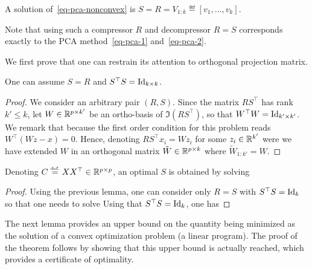 \begin{thm}\label{thm-pca-optim}
	A solution of~\eqref{eq-pca-nonconvex} is $S=R=V_{1:k} \eqdef [v_1,\ldots,v_k]$.
\end{thm}

Note that using such a compressor $R$ and decompressor $R=S$ corresponds exactly to the PCA method~\eqref{eq-pca-1} and~\eqref{eq-pca-2}.

We first prove that one can restrain its attention to orthogonal projection matrix.

\begin{lem}
	One can assume $S=R$ and $S^\top S = \mathrm{Id}_{k\times k}$.
\end{lem}
\begin{proof}
	We consider an arbitrary pair $(R,S)$. Since the matrix $R S^\top$ has rank $k' \leq k$, let $W \in \mathbb{R}^{p \times k'}$ be an ortho-basis of $\Im(RS^\top)$, so that $W^\top W = \mathrm{Id}_{k' \times k'}$. We remark that 
	because the first order condition for this problem reads $W^\top(Wz-x)=0$.
	Hence, denoting $RS^\top x_i = Wz_i$ for some $z_i \in \mathbb{R}^{k'}$
	were we have extended $W$ in an orthogonal matrix $\tilde W \in \mathbb{R}^{p \times k}$ where $\tilde W_{1:k'}=W$.
\end{proof}

\begin{lem}
	Denoting $C \stackrel{\mbox{\upshape\tiny def.}}{=} XX^\top \in \mathbb{R}^{p \times p}$, an optimal $S$ is obtained by solving
\end{lem}
\begin{proof}
	Using the previous lemma, one can consider only $R=S$ with $S^\top S=\mathrm{Id}_{k}$ so that one needs to solve
	Using that $S^\top S=\mathrm{Id}_k$, one has
\end{proof}

The next lemma provides an upper bound on the quantity being minimized as the solution of a convex optimization problem (a linear program). The proof of the theorem follows by showing that this upper bound is actually reached, which provides a certificate of optimality.  

